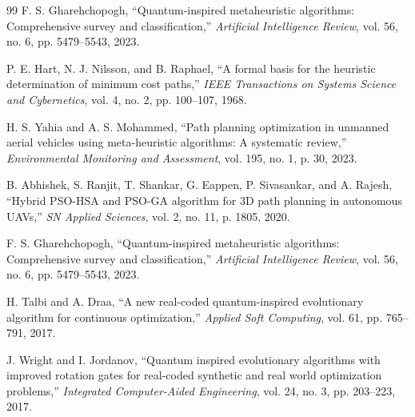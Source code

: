 {\begin{thebibliography}{99}
F. S. Gharehchopogh, ``Quantum-inspired metaheuristic algorithms: Comprehensive survey and classification,'' \textit{Artificial Intelligence Review}, vol. 56, no. 6, pp. 5479--5543, 2023.

P. E. Hart, N. J. Nilsson, and B. Raphael, ``A formal basis for the heuristic determination of minimum cost paths,'' \textit{IEEE Transactions on Systems Science and Cybernetics}, vol. 4, no. 2, pp. 100--107, 1968.

H. S. Yahia and A. S. Mohammed, ``Path planning optimization in unmanned aerial vehicles using meta-heuristic algorithms: A systematic review,'' \textit{Environmental Monitoring and Assessment}, vol. 195, no. 1, p. 30, 2023.

B. Abhishek, S. Ranjit, T. Shankar, G. Eappen, P. Sivasankar, and A. Rajesh, ``Hybrid PSO-HSA and PSO-GA algorithm for 3D path planning in autonomous UAVs,'' \textit{SN Applied Sciences}, vol. 2, no. 11, p. 1805, 2020.

F. S. Gharehchopogh, ``Quantum-inspired metaheuristic algorithms: Comprehensive survey and classification,'' \textit{Artificial Intelligence Review}, vol. 56, no. 6, pp. 5479--5543, 2023.

H. Talbi and A. Draa, ``A new real-coded quantum-inspired evolutionary algorithm for continuous optimization,'' \textit{Applied Soft Computing}, vol. 61, pp. 765--791, 2017.

J. Wright and I. Jordanov, ``Quantum inspired evolutionary algorithms with improved rotation gates for real-coded synthetic and real world optimization problems,'' \textit{Integrated Computer-Aided Engineering}, vol. 24, no. 3, pp. 203--223, 2017.

\end{thebibliography}
}

